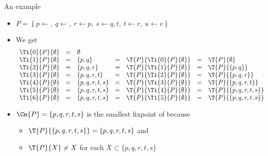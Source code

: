 \begin{frame}{An example}
  \begin{itemize}
  \item
    \(
    P
    =
    \left\{
      p \leftarrow ,           \
      q \leftarrow ,           \
      r \leftarrow p,          \
      s \leftarrow q, t,       \
      t \leftarrow r,          \
      u \leftarrow v
    \right\}
    \)
  \item<2-> We get
    \[
    \begin{array}{lclclcl}
      \Ti{0}{P}{\emptyset}&=&\emptyset    & &                           & &                    \\
      \Ti{1}{P}{\emptyset}&=&\{p,q\}      &=&\T{P}{\Ti{0}{P}{\emptyset}}&=&\T{P}{\emptyset}    \\
      \Ti{2}{P}{\emptyset}&=&\{p,q,r\}    &=&\T{P}{\Ti{1}{P}{\emptyset}}&=&\T{P}{\{p,q\}}      \\
      \Ti{3}{P}{\emptyset}&=&\{p,q,r,t\}  &=&\T{P}{\Ti{2}{P}{\emptyset}}&=&\T{P}{\{p,q,r\}}    \\
      \Ti{4}{P}{\emptyset}&=&\{p,q,r,t,s\}&=&\T{P}{\Ti{3}{P}{\emptyset}}&=&\T{P}{\{p,q,r,t\}}  \\
      \Ti{5}{P}{\emptyset}&=&\{p,q,r,t,s\}&=&\T{P}{\Ti{4}{P}{\emptyset}}&=&\T{P}{\{p,q,r,t,s\}}\\
      \Ti{6}{P}{\emptyset}&=&\{p,q,r,t,s\}&=&\T{P}{\Ti{5}{P}{\emptyset}}&=&\T{P}{\{p,q,r,t,s\}}
    \end{array}
    \]
  \item<3-> $\Cn{P}=\{p,q,r,t,s\}$ is the smallest fixpoint of \Top{P}
    because
    \begin{itemize}\normalsize
    \item $\T{P}{\{p,q,r,t,s\}}=\{p,q,r,t,s\}$ and
    \item $\T{P}{X}\neq X$ for each $X\subset  \{p,q,r,t,s\}$
    \end{itemize}
  \end{itemize}
  \smallskip
\end{frame}
%
